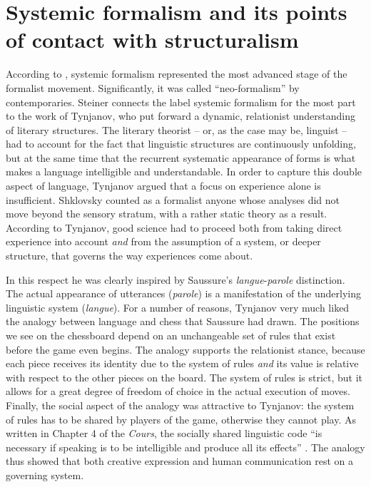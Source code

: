 \documentclass[output=paper]{langscibook}
\begin{document}
\section{Systemic formalism and its points of contact with structuralism}
\label{sec:karstens:systemicformalism}

According to \citet[112]{Steiner1984}, systemic formalism represented the most advanced stage of the formalist movement. Significantly, it was called ``neo-for\-mal\-ism'' by contemporaries. Steiner connects the label systemic formalism for the most part to the work of Tynjanov, who put forward a dynamic, relationist understanding of literary structures. The literary theorist -- or, as the case may be, linguist -- had to account for the fact that linguistic structures are continuously unfolding, but at the same time that the recurrent systematic appearance of forms is what makes a language intelligible and understandable. In order to capture this double aspect of language, Tynjanov argued that a focus on experience alone is insufficient. Shklovsky counted as a formalist anyone whose analyses did not move beyond the sensory stratum, with a rather static theory as a result. According to Tynjanov, good science had to proceed both from taking direct experience into account \emph{and} from the assumption of a system, or deeper structure, that governs the way experiences come about. 

\largerpage[-1]In this respect he was clearly inspired by Saussure's \emph{langue}-\emph{parole} distinction. The actual appearance of utterances (\emph{parole}) is a manifestation of the underlying linguistic system (\emph{langue}). For a number of reasons, Tynjanov very much liked the analogy between language and chess that Saussure had drawn. The positions we see on the chessboard depend on an unchangeable set of rules that exist before the game even begins. The analogy supports the relationist stance, because each piece receives its identity due to the system of rules \emph{and} its value is relative with respect to the other pieces on the board. The system of rules is strict, but it allows for a great degree of freedom of choice in the actual execution of moves. Finally, the social aspect of the analogy was attractive to Tynjanov: the system of rules has to be shared by players of the game, otherwise they cannot play. As written in Chapter 4 of the \emph{Cours}, the socially shared linguistic code ``is necessary if speaking is to be intelligible and produce all its effects'' \citep[37]{Saussure19221916}. The analogy thus showed that both creative expression and human communication rest on a governing system.
\end{document}
